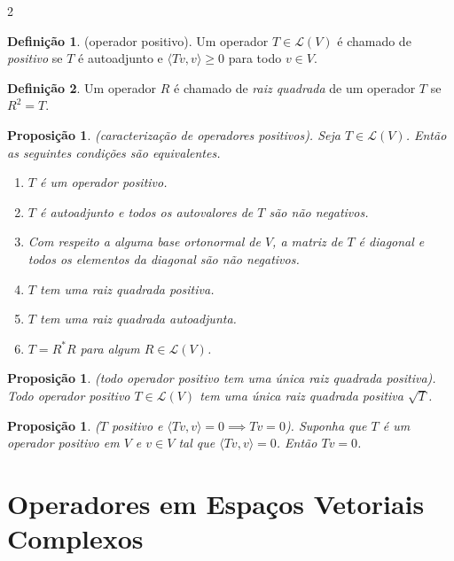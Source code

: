 \documentclass{article}
\theoremstyle{plain}
\newtheorem{prop}[thm]{Proposição}
\theoremstyle{definition}
\newtheorem{defn}{Definição}[section]
\theoremstyle{remark}
\begin{document}
\begin{multicols}{2}
\begin{defn} (operador positivo).
    Um operador \(T \in \mathcal{L}(V)\) é chamado de \emph{positivo} se \(T\) é autoadjunto e \(\langle Tv, v \rangle \geq 0\) para todo \(v \in V\).
\end{defn}

\begin{defn}
    Um operador \(R\) é chamado de \emph{raiz quadrada} de um operador \(T\) se \(R^2 = T\).
\end{defn}

\begin{prop} (caracterização de operadores positivos).
    Seja \(T \in \mathcal{L}(V)\). Então as seguintes condições são equivalentes.
    \begin{enumerate}
        \item [\textup{(a)}] \(T\) é um operador positivo.
        \item [\textup{(b)}] \(T\) é autoadjunto e todos os autovalores de \(T\) são não negativos.
        \item [\textup{(c)}] Com respeito a alguma base ortonormal de \(V\), a matriz de \(T\) é diagonal e todos os elementos da diagonal são não negativos.
        \item [\textup{(d)}] \(T\) tem uma raiz quadrada positiva.
        \item [\textup{(e)}] \(T\) tem uma raiz quadrada autoadjunta.
        \item [\textup{(f)}] \(T = R^* R\) para algum \(R \in \mathcal{L}(V)\).
    \end{enumerate}
\end{prop}

\begin{prop} (todo operador positivo tem uma única raiz quadrada positiva).
    Todo operador positivo \(T \in \mathcal{L}(V)\) tem uma única raiz quadrada positiva \(\sqrt{T}\).
\end{prop}

\begin{prop} (\(T\) positivo e \(\langle Tv, v \rangle = 0 \implies Tv = 0\)).
    Suponha que \(T\) é um operador positivo em \(V\) e \(v \in V\) tal que \(\langle Tv, v \rangle = 0\). Então \(Tv = 0\).
\end{prop}

\section{Operadores em Espaços Vetoriais Complexos}


\end{multicols}
\end{document}
